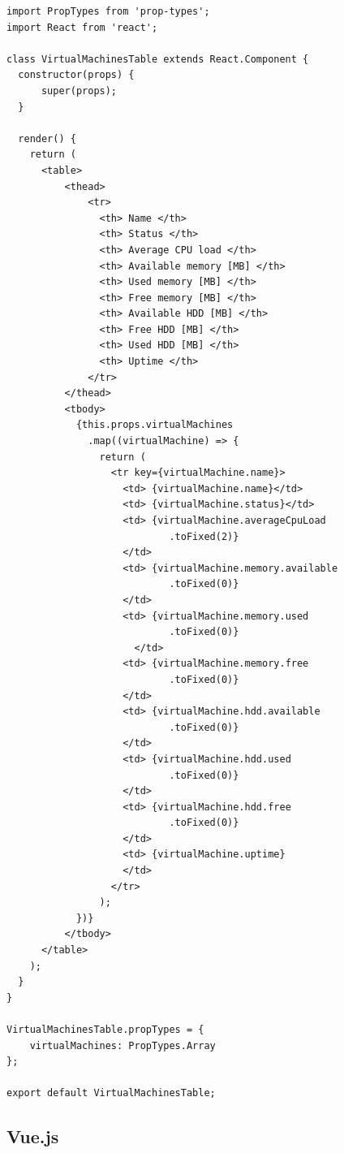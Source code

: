 \documentclass[polish, twoside, 12pt]{mwart}
\begin{document}
\begin{lstlisting}[caption=Komponent tabeli]
import PropTypes from 'prop-types'; 
import React from 'react';

class VirtualMachinesTable extends React.Component {
  constructor(props) {
      super(props);
  }

  render() {
    return (
      <table>
          <thead>
              <tr>
                <th> Name </th>
                <th> Status </th>
                <th> Average CPU load </th>
                <th> Available memory [MB] </th>
                <th> Used memory [MB] </th>
                <th> Free memory [MB] </th>
                <th> Available HDD [MB] </th>
                <th> Free HDD [MB] </th>
                <th> Used HDD [MB] </th>
                <th> Uptime </th>
              </tr>
          </thead>
          <tbody>
            {this.props.virtualMachines
              .map((virtualMachine) => {
                return (
                  <tr key={virtualMachine.name}>
                    <td> {virtualMachine.name}</td>
                    <td> {virtualMachine.status}</td>
                    <td> {virtualMachine.averageCpuLoad
                            .toFixed(2)} 
                    </td>
                    <td> {virtualMachine.memory.available
                            .toFixed(0)}
                    </td>
                    <td> {virtualMachine.memory.used
                            .toFixed(0)}
                      </td>
                    <td> {virtualMachine.memory.free
                            .toFixed(0)}
                    </td>
                    <td> {virtualMachine.hdd.available
                            .toFixed(0)}
                    </td>
                    <td> {virtualMachine.hdd.used
                            .toFixed(0)}
                    </td>
                    <td> {virtualMachine.hdd.free
                            .toFixed(0)}
                    </td>
                    <td> {virtualMachine.uptime}
                    </td>
                  </tr>
                );
            })}
          </tbody>
      </table>
    );
  }
}

VirtualMachinesTable.propTypes = {
    virtualMachines: PropTypes.Array
};

export default VirtualMachinesTable;
\end{lstlisting}

\subsection{Vue.js}
\end{document}

